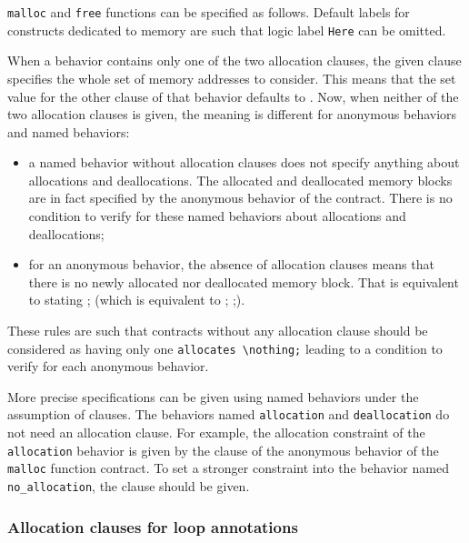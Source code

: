 \begin{example}
  \lstinline|malloc| and \lstinline|free| functions can be specified as follows.
  Default labels for constructs dedicated to memory are 
  such that logic label \lstinline|Here| can be omitted.
\end{example}

When a behavior contains only one of the two allocation clauses,
the given clause specifies the whole set of memory addresses to consider.
This means that the set value for the other clause of that behavior defaults to \nothing.
Now, when neither of the two allocation clauses is given, the meaning is different
for anonymous behaviors and named behaviors:
\begin{itemize}
\item a named behavior without allocation clauses does not specify anything about
      allocations and deallocations. 
      The allocated and deallocated memory blocks are in fact specified by the 
      anonymous behavior of the contract.
      There is no condition to verify for these named behaviors about allocations 
      and deallocations;
\item for an anonymous behavior, the absence of allocation clauses means that there is no newly 
      allocated nor deallocated memory block. 
      That is equivalent to stating \allocates \nothing; (which is equivalent to  \allocates \nothing; \frees \nothing;).
\end{itemize}
These rules are such that contracts without any allocation clause
should be considered 
as having only one \lstinline|allocates \nothing;| 
leading to a condition to verify for 
each anonymous behavior.

\begin{example}
  More precise specifications can be given using named behaviors under the 
  assumption of \assumes clauses.
  The behaviors named \lstinline|allocation| and
  \lstinline|deallocation| do not 
  need an allocation clause.
  For example, the allocation constraint of the \lstinline|allocation| behavior 
  is given by the clause \allocates \result of the anonymous behavior of the  
  \lstinline|malloc| function contract. 
  To set a stronger constraint into the behavior named \lstinline|no_allocation|,
  the clause \allocates \nothing should be given.
\end{example}

\subsubsection{Allocation clauses for loop annotations}


